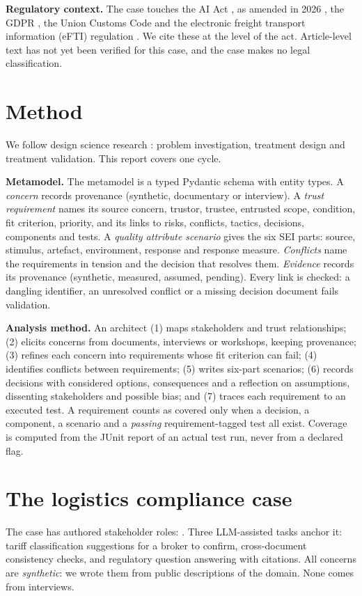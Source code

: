\documentclass[10pt,twocolumn]{article}
\begin{document}
\textbf{Regulatory context.} The case touches the AI Act \cite{aiact}, as amended in 2026 \cite{omnibus2026}, the GDPR \cite{gdpr}, the Union Customs Code \cite{ucc} and the electronic freight transport information (eFTI) regulation \cite{efti}. We cite these at the level of the act. Article-level text has not yet been verified for this case, and the case makes no legal classification.

\section{Method}\label{sec:method}
We follow design science research \cite{hevner2004,wieringa2014}: problem investigation, treatment design and treatment validation. This report covers one cycle.

\textbf{Metamodel.} The metamodel is a typed Pydantic schema with \NEntityTypes{} entity types. A \emph{concern} records provenance (synthetic, documentary or interview). A \emph{trust requirement} names its source concern, trustor, trustee, entrusted scope, condition, fit criterion, priority, and its links to risks, conflicts, tactics, decisions, components and tests. A \emph{quality attribute scenario} gives the six SEI parts: source, stimulus, artefact, environment, response and response measure. \emph{Conflicts} name the requirements in tension and the decision that resolves them. \emph{Evidence} records its provenance (synthetic, measured, assumed, pending). Every link is checked: a dangling identifier, an unresolved conflict or a missing decision document fails validation.

\textbf{Analysis method.} An architect (1) maps stakeholders and trust relationships; (2) elicits concerns from documents, interviews or workshops, keeping provenance; (3) refines each concern into requirements whose fit criterion can fail; (4) identifies conflicts between requirements; (5) writes six-part scenarios; (6) records decisions with considered options, consequences and a reflection on assumptions, dissenting stakeholders and possible bias; and (7) traces each requirement to an executed test. A requirement counts as covered only when a decision, a component, a scenario and a \emph{passing} requirement-tagged test all exist. Coverage is computed from the JUnit report of an actual test run, never from a declared flag.

\section{The logistics compliance case}\label{sec:case}
The case has \NRolesWord{} authored stakeholder roles: \RoleList{}. Three LLM-assisted tasks anchor it: tariff classification suggestions for a broker to confirm, cross-document consistency checks, and regulatory question answering with citations. All concerns are \emph{synthetic}: we wrote them from public descriptions of the domain. None comes from interviews.
\end{document}

